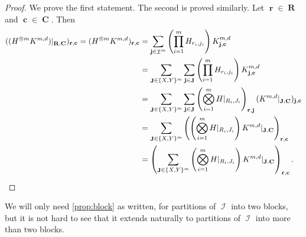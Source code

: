 \documentclass{theoretics}
\DeclareMathOperator{\vr}{\mathbf{R}}
\DeclareMathOperator{\vrr}{\mathbf{r}}
\DeclareMathOperator{\vc}{\mathbf{C}}
\DeclareMathOperator{\vcc}{\mathbf{c}}
\DeclareMathOperator{\vj}{\mathbf{J}}
\DeclareMathOperator{\vjj}{\mathbf{j}}
\DeclareMathOperator{\ic}{\mathcal{I}}
\begin{document}
\begin{proof}
    We prove the first statement. The second is proved similarly.
    Let $\vrr \in \vr$ and $\vcc \in \vc$. Then
    \begin{align*}
        ((H^{\otimes m} K^{m,d})|_{\vr,\vc})_{\vrr,\vcc}
        = (H^{\otimes m} K^{m,d})_{\vrr,\vcc}
        &= \sum_{\vjj\in\ic^m} \left(\prod_{i=1}^m H_{r_i,j_i}\right)K^{m,d}_{\vjj,\vcc}\\
        &= \sum_{\vj\in\{X,Y\}^m} \sum_{\vjj\in\vj} \left(\prod_{i=1}^m H_{r_i,j_i}\right)K^{m,d}_{\vjj,\vcc}\\
        &= \sum_{\vj \in \{X,Y\}^m} \sum_{\vjj\in\vj}\left(\bigotimes_{i=1}^m H|_{R_i,J_i}\right)_{\vrr,\vjj} (K^{m,d}|_{\vj,\vc})_{\vjj,\vcc}\\
        &= \sum_{\vj \in \{X,Y\}^m} \left(\left(\bigotimes_{i=1}^m H|_{R_i,J_i}\right) K^{m,d}|_{\vj,\vc}\right)_{\vrr,\vcc} \\
        &= \left(\sum_{\vj \in \{X,Y\}^m} \left(\bigotimes_{i=1}^m H|_{R_i,J_i}\right) K^{m,d}|_{\vj,\vc}\right)_{\vrr,\vcc}. \qedhere
    \end{align*}
\end{proof}
We will only need \autoref{prop:block} as written, for partitions of $\ic$ into two blocks, but it is
not hard to see that it extends naturally to partitions of $\ic$ into more than two blocks.
\end{document}
